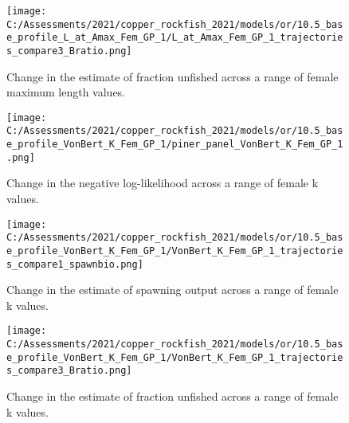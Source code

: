 \documentclass[11pt,
  english,
  a4paper,
]{article}
\begin{document}
\tagmcend\tagstructend


\begin{figure}
\centering
\texttt{[image: C:/Assessments/2021/copper\_rockfish\_2021/models/or/10.5\_base\_profile\_L\_at\_Amax\_Fem\_GP\_1/L\_at\_Amax\_Fem\_GP\_1\_trajectories\_compare3\_Bratio.png]}
\caption{Change in the estimate of fraction unfished across a range of female maximum length values.\label{fig:linf-depl}}
\end{figure}

\tagmcend\tagstructend


\begin{figure}
\centering
\texttt{[image: C:/Assessments/2021/copper\_rockfish\_2021/models/or/10.5\_base\_profile\_VonBert\_K\_Fem\_GP\_1/piner\_panel\_VonBert\_K\_Fem\_GP\_1.png]}
\caption{Change in the negative log-likelihood across a range of female k values.\label{fig:k-profile}}
\end{figure}

\tagmcend\tagstructend


\begin{figure}
\centering
\texttt{[image: C:/Assessments/2021/copper\_rockfish\_2021/models/or/10.5\_base\_profile\_VonBert\_K\_Fem\_GP\_1/VonBert\_K\_Fem\_GP\_1\_trajectories\_compare1\_spawnbio.png]}
\caption{Change in the estimate of spawning output across a range of female k values.\label{fig:k-ssb}}
\end{figure}

\tagmcend\tagstructend


\begin{figure}
\centering
\texttt{[image: C:/Assessments/2021/copper\_rockfish\_2021/models/or/10.5\_base\_profile\_VonBert\_K\_Fem\_GP\_1/VonBert\_K\_Fem\_GP\_1\_trajectories\_compare3\_Bratio.png]}
\caption{Change in the estimate of fraction unfished across a range of female k values.\label{fig:k-depl}}
\end{figure}

\tagmcend\tagstructend

\end{document}

